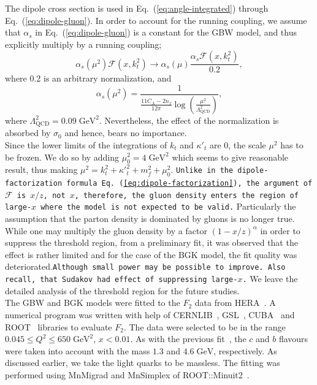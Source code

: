 \documentclass[11pt]{article}
\numberwithin{equation}{section}
\numberwithin{table}{section}
\numberwithin{figure}{section}
\newcommand{\comment}[1]{\texttt{\color{red}#1}}
\begin{document}
The dipole cross section is used in Eq.~(\ref{eq:angle-integrated}) through Eq.~(\ref{eq:dipole-gluon}).
In order to account for the running coupling, we assume that $\alpha_s$ in Eq.~(\ref{eq:dipole-gluon}) is a constant for the GBW model, and thus explicitly multiply by a running  coupling;
\begin{equation}
\alpha_s(\mu^2)\mathcal{F}(x,k_t^2)\rightarrow \alpha_s(\mu)\frac{\alpha_s\mathcal{F}(x,k_t^2)}{0.2},
\end{equation}
where 0.2 is an arbitrary normalization, and 
\begin{equation}
\alpha_s(\mu^2)=\frac{1}{\frac{11 C_A-2n_f}{12\pi}\log\left(\frac{\mu^2}{\Lambda_{\mathrm{QCD}}^2 }\right)},
\end{equation}
where $\Lambda_{\mathrm{QCD}}^2=0.09\;\mathrm{GeV^2}$.
Nevertheless, the effect of the normalization is absorbed by $\sigma_0$ and hence, bears no importance. \\
Since the lower limits of the integrations of $k_t$ and ${\kappa'}_t$ are 0, the scale $\mu^2$ has to be frozen. We do so by adding $\mu_0^2=4\;\mathrm{GeV^2}$ which seems to give reasonable result, thus making $\mu^2=k_t^2+{\kappa'}_t^2+m_f^2+\mu_0^2$. 
\comment{Unlike in the dipole-factorization formula Eq.~(\ref{eq:dipole-factorization}), the argument of $\mathcal{F}$ is $x/z$, not $x$, therefore, the gluon density enters the region of large-$x$ where the model is not expected to be valid.} Particularly the assumption that the parton density is dominated by gluons is no longer true.  While one may multiply the gluon density by a factor $(1-x/z)^\alpha$ in order to suppress the threshold region\cite{Timneanu:2001bk}, from a preliminary fit, it was observed that the effect is rather limited and for the case of the BGK model, the fit quality was deteriorated.\comment{Although small power may be possible to improve. Also recall, that Sudakov had effect of suppressing large-$x$.} 
We leave the detailed analysis of the threshold region for the future studies. \\
The GBW and BGK models were fitted to the $F_2$ data from HERA~\cite{Abt:2017nkc}. A numerical program was written with help of CERNLIB~\cite{Kolbig:1972zz}, GSL~\cite{GSL}, CUBA~\cite{Hahn:2004fe} and ROOT~\cite{Brun:1997pa} libraries to evaluate $F_2$. The data were selected to be in the range $0.045\leq Q^2\leq 650\;\mathrm{GeV^2}$, $x<0.01$.
As with the previous fit~\cite{Goda:2022wsc}, the $c$ and $b$ flavours were taken into account with the mass $1.3$ and $4.6\;\mathrm{GeV}$, respectively. As discussed earlier, we take the light quarks to be massless.
The fitting was performed using MnMigrad and MnSimplex of ROOT::Minuit2~\cite{James:2004xla}.
\end{document}
